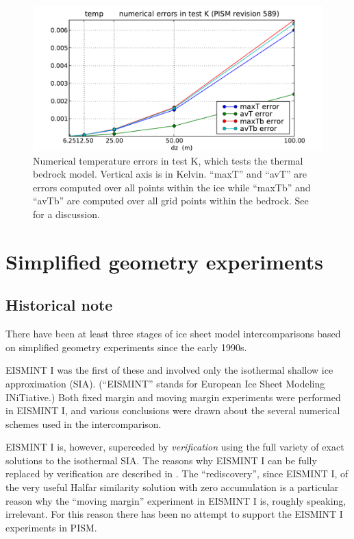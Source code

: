 \documentclass[11pt,final]{amsart}
\begin{document}
\begin{figure}[ht]
\includegraphics[width=4.8in,keepaspectratio=true]{figs/temperrs_K}
\caption{Numerical temperature errors in test K, which tests the thermal bedrock model.  Vertical axis is in Kelvin.  ``maxT'' and ``avT'' are errors computed over all points within the ice while ``maxTb'' and ``avTb'' are computed over all grid points within the bedrock.  See \cite{BuelerTestK} for a discussion.}
\label{fig:temperrsK}
\end{figure}


\clearpage\newpage
\section{Simplified geometry experiments}\label{sect:simp}

\subsection{Historical note}  There have been at least three stages of ice sheet model intercomparisons based on simplified geometry experiments since the early 1990s.

EISMINT I \cite{EISMINT96} was the first of these and involved only the isothermal shallow ice approximation (SIA).  (``EISMINT'' stands for European Ice Sheet Modeling INiTiative.)  Both fixed margin and moving margin experiments were performed in EISMINT I, and various conclusions were drawn about the several numerical schemes used in the intercomparison.  

EISMINT I is, however, superceded by \emph{verification} using the full variety of exact solutions to the isothermal SIA.  The reasons why EISMINT I can be fully replaced by verification are described in \cite{BLKCB}.  The ``rediscovery'', since EISMINT I, of the very useful Halfar similarity solution with zero accumulation \cite{Halfar83} is a particular reason why the ``moving margin'' experiment in EISMINT I is, roughly speaking, irrelevant.  For this reason there has been no attempt to support the EISMINT I experiments in PISM.
\end{document}
